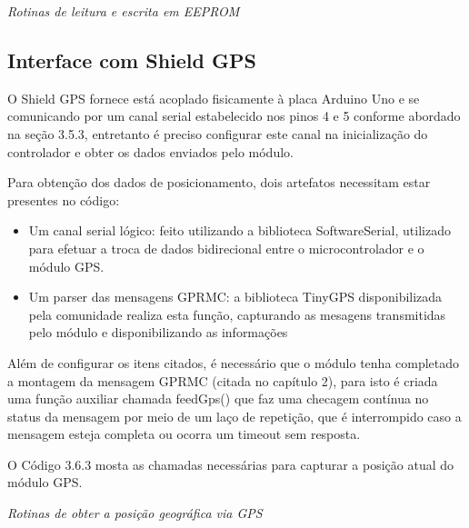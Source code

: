 \renewcommand{\baselinestretch}{0.5}  %
\begin{codigo}[htb]
\fontsize{9pt}{9pt}\selectfont
      \begin{boxit}  %
      \vspace{2mm}
   \end{boxit}
   \caption{\it Rotinas de leitura e escrita em EEPROM}
   \label{code:eeprom}
\end{codigo}
  

\subsection{Interface com Shield GPS}

O Shield GPS fornece está acoplado fisicamente à placa Arduino Uno e se comunicando por um canal serial estabelecido nos pinos 4 e 5 conforme abordado na seção 3.5.3, entretanto é preciso configurar este canal na inicialização do controlador e obter os dados enviados pelo módulo.

Para obtenção dos dados de posicionamento, dois artefatos necessitam estar presentes no código: 

\begin{itemize}
	\item Um canal serial lógico: feito utilizando a biblioteca SoftwareSerial, utilizado para efetuar a troca de dados bidirecional entre o microcontrolador e o módulo GPS.
	\item Um parser das mensagens GPRMC: a biblioteca TinyGPS disponibilizada pela comunidade realiza esta função, capturando as mesagens transmitidas pelo módulo e disponibilizando as informações 
\end{itemize}

Além de configurar os itens citados, é necessário que o módulo tenha completado a montagem da mensagem GPRMC (citada no capítulo 2), para isto é criada uma função auxiliar chamada feedGps() que faz uma checagem contínua no status da mensagem por meio de um laço de repetição, que é interrompido caso a mensagem esteja completa ou ocorra um timeout sem resposta.

O Código 3.6.3 mosta as chamadas necessárias para capturar a posição atual do módulo GPS.

\renewcommand{\baselinestretch}{0.5}  %
\begin{codigo}[htb]
\fontsize{9pt}{9pt}\selectfont
      \begin{boxit}  %
      \vspace{2mm}
   \end{boxit}
   \caption{\it Rotinas de obter a posição geográfica via GPS}
   \label{code:codegps}
\end{codigo}


